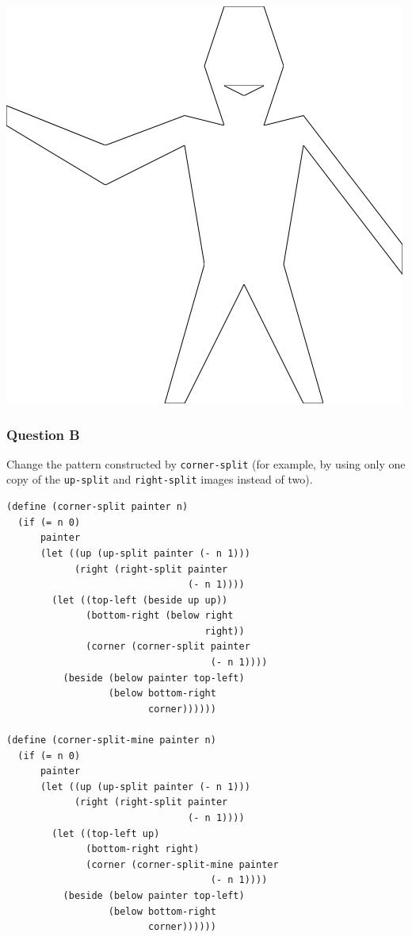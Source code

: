 \documentclass[final,fleqn,titlepage,twoside]{article}
\begin{document}
\begin{center}
\includegraphics[width=.9\linewidth]{2/pict/wave-smile-test.png}
\end{center}

\subsubsection{Question B}
\label{sec:org1f1b851}
Change the pattern constructed by \texttt{corner-split} (for example, by
using only one copy of the \texttt{up-split} and \texttt{right-split}
images instead of two).

\begin{verbatim}
(define (corner-split painter n)
  (if (= n 0)
      painter
      (let ((up (up-split painter (- n 1)))
            (right (right-split painter 
                                (- n 1))))
        (let ((top-left (beside up up))
              (bottom-right (below right 
                                   right))
              (corner (corner-split painter 
                                    (- n 1))))
          (beside (below painter top-left)
                  (below bottom-right 
                         corner))))))

(define (corner-split-mine painter n)
  (if (= n 0)
      painter
      (let ((up (up-split painter (- n 1)))
            (right (right-split painter 
                                (- n 1))))
        (let ((top-left up)
              (bottom-right right)
              (corner (corner-split-mine painter 
                                    (- n 1))))
          (beside (below painter top-left)
                  (below bottom-right 
                         corner))))))
\end{verbatim}
\end{document}
